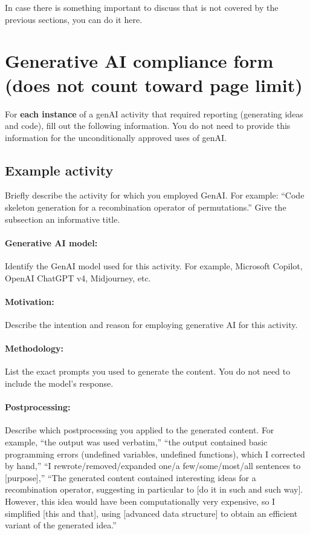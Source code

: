 \documentclass[a4paper,10pt]{article}
\newcommand{\ReplaceMe}[1]{{\color{blue}#1}}
\newcommand{\RemoveMe}[1]{{\color{purple}#1}}
\begin{document}
\ReplaceMe{In case there is something important to discuss that is not covered by the previous sections, you can do it here. }

\section{Generative AI compliance form \hfill(does not count toward page limit)} \label{sec_genai}

\RemoveMe{For \textbf{each instance} of a genAI activity that required reporting (generating ideas and code), fill out the following information. You do not need to provide this information for the unconditionally approved uses of genAI.}

\subsection{Example activity} \ReplaceMe{Briefly describe the activity for which you employed GenAI. For example: ``Code skeleton generation for a recombination operator of permutations.'' Give the subsection an informative title.}

\paragraph{Generative AI model:} \ReplaceMe{Identify the GenAI model used for this activity. For example, Microsoft Copilot, OpenAI ChatGPT v4, Midjourney, etc.}

\paragraph{Motivation:} \ReplaceMe{Describe the intention and reason for employing generative AI for this activity.}

\paragraph{Methodology:} \ReplaceMe{List the exact prompts you used to generate the content. You do not need to include the model's response.}

\paragraph{Postprocessing:} \ReplaceMe{Describe which postprocessing you applied to the generated content. For example, ``the output was used verbatim,'' ``the output contained basic programming errors (undefined variables, undefined functions), which I corrected by hand,'' ``I rewrote/removed/expanded one/a few/some/most/all sentences to [purpose],'' ``The generated content contained interesting ideas for a recombination operator, suggesting in particular to [do it in such and such way]. However, this idea would have been computationally very expensive, so I simplified [this and that], using [advanced data structure] to obtain an efficient variant of the generated idea.''}
\end{document}
